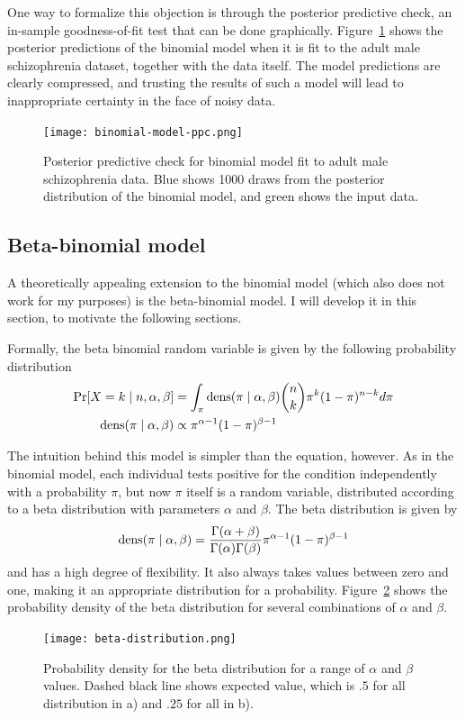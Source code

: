 One way to formalize this objection is through the posterior
predictive check, an in-sample goodness-of-fit test that can be done
graphically.  Figure~\ref{fig:theory-rate_model-binom_ppc} shows the
posterior predictions of the binomial model when it is fit to the
adult male schizophrenia dataset, together with the data itself.  The
model predictions are clearly compressed, and trusting the results of
such a model will lead to inappropriate certainty in the face of noisy
data.

\begin{figure}[ht]
\begin{center}
\texttt{[image: binomial-model-ppc.png]}
\end{center}
\caption{Posterior predictive check for binomial model fit to adult
  male schizophrenia data.  Blue shows 1000 draws from the posterior
  distribution of the binomial model, and green shows the input data.}
\label{fig:theory-rate_model-binom_ppc}
\end{figure}




\subsection{Beta-binomial model}
\label{beta-binomial-model}
A theoretically appealing extension to the binomial model (which also
does not work for my purposes) is the beta-binomial model.  I will
develop it in this section, to motivate the following sections.

Formally, the beta binomial random variable is given by the following
probability distribution
\begin{align*}
\operatorname{Pr}[X = k\;|\; n, \alpha, \beta] 
  &= \int_{\pi}\operatorname{dens}(\pi\;|\; \alpha, \beta) \binom{n}{k}\pi^k(1-\pi)^{n-k}
d\pi\\
\operatorname{dens}(\pi\;|\; \alpha, \beta) &\propto \pi^{\alpha-1}(1-\pi)^{\beta-1}
\end{align*}

The intuition behind this model is simpler than the equation, however.
As in the binomial model, each individual tests positive for the condition independently
with a probability $\pi$, but now $\pi$ itself is a random variable,
distributed according to a beta distribution with parameters $\alpha$
and $\beta$. The beta distribution is given by 
\[
\operatorname{dens}(\pi\;|\; \alpha, \beta) =
\frac{\Gamma(\alpha+\beta)}{\Gamma(\alpha)\Gamma(\beta)}\pi^{\alpha-1}(1-\pi)^{\beta-1}
\]
and has a high degree of flexibility.  It also always takes values
between zero and one, making it an appropriate distribution for a
probability.  Figure~\ref{fig:theory-rate_model-beta} shows the
probability density of the beta distribution for several combinations
of $\alpha$ and $\beta$.
\begin{figure}[ht]
\begin{center}
\texttt{[image: beta-distribution.png]}
\end{center}
\caption{Probability density for the beta distribution for a range of
  $\alpha$ and $\beta$ values. Dashed black line shows expected value,
which is $.5$ for all distribution in a) and $.25$ for all in b).}
\label{fig:theory-rate_model-beta}
\end{figure}

